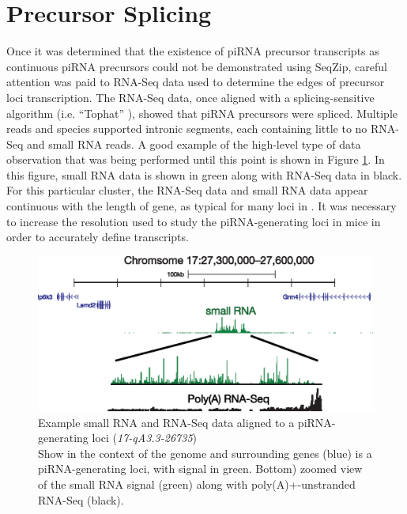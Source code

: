 \section{Precursor Splicing}
  \label{SeqZipMethod:sec:piRNA precursors are spliced}

  Once it was determined that the existence of piRNA precursor transcripts as continuous piRNA precursors could not be demonstrated using SeqZip, careful attention was paid to RNA-Seq data used to determine the edges of precursor loci transcription. The RNA-Seq data, once aligned with a splicing-sensitive algorithm (i.e. ``Tophat'' \citep{Trapnell2009}), showed that piRNA precursors were spliced. Multiple reads and species supported intronic segments, each containing little to no RNA-Seq and small RNA reads. A good example of the high-level type of data observation that was being performed until this point is shown in Figure \ref{SeqZipMethod:fig:evidence for precusor splicing}. In this figure, small RNA data is shown in green along with RNA-Seq data in black. For this particular cluster, the RNA-Seq data and small RNA data appear continuous with the length of gene, as typical for many loci in \flies{}. It was necessary to increase the resolution used to study the piRNA-generating loci in mice in order to accurately define transcripts.

  \begin{figure} %
    \centering 
    \includegraphics{Figures/SeqZipMethod/evidenceForPrecursorSplicing.eps}
    \caption[Example small RNA and RNA-Seq data aligned to a piRNA-generating loci]
    {
      Example small RNA and RNA-Seq data aligned to a piRNA-generating loci (\textit{17-qA3.3-26735})\\[0.25cm]
      Show in the context of the genome and surrounding genes (blue) is a piRNA-generating loci, with signal in green. Bottom) zoomed view of the small RNA signal (green) along with poly(A)+-unstranded RNA-Seq (black).
      }
    \label{SeqZipMethod:fig:evidence for precusor splicing}
    \end{figure}

